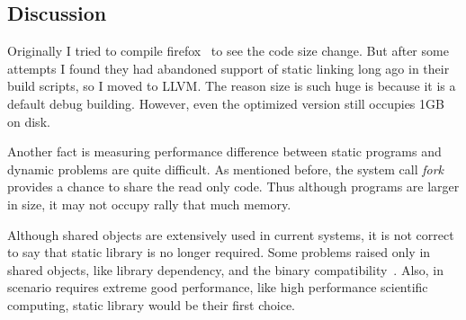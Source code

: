 \subsection{Discussion}
Originally I tried to compile firefox~\cite{firefox} to see the code size
change. But after some attempts I found they had abandoned support of static linking 
long ago in their build scripts, so I moved to LLVM. The reason size is such huge
is because it is a default debug building. However, even the optimized version
still occupies 1GB on disk.

Another fact is measuring performance difference between static programs and
dynamic problems are quite difficult. As mentioned before, the system call
\emph{fork} provides a chance to share the read only code. Thus although
programs are larger in size, it may not occupy rally that much memory. 

Although shared objects are extensively used in current systems, it is not
correct to say that static library is no longer required. Some problems 
raised only in shared objects, like library dependency, and the binary 
compatibility~\cite{dllhell}. Also, in scenario requires extreme good performance,
like high performance scientific computing, static library would be their
first choice. 
